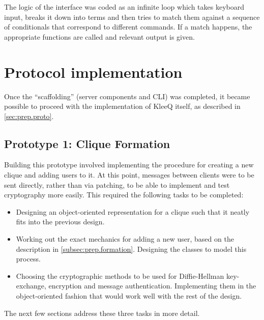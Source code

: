 \documentclass[a4paper, 12pt]{report}
\begin{document}
The logic of the interface was coded as an infinite loop which takes keyboard input, breaks it down into terms and then tries to match them against a sequence of conditionals that correspond to different commands. If a match happens, the appropriate functions are called and relevant output is given.


\section{Protocol implementation}
\label{sec:impl.proto}
Once the ``scaffolding'' (server components and CLI) was completed, it became possible to proceed with the implementation of KleeQ itself, as described in \cref{sec:prep.proto}.


\subsection{Prototype 1: Clique Formation}
\label{subsec:impl.proto.formation}
Building this prototype involved implementing the procedure for creating a new clique and adding users to it. At this point, messages between clients were to be sent directly, rather than via patching, to be able to implement and test cryptography more easily. This required the following tasks to be completed:

\begin{itemize}
    \item Designing an object-oriented representation for a clique such that it neatly fits into the previous design.
    \item Working out the exact mechanics for adding a new user, based on the description in \cref{subsec:prep.formation}. Designing the classes to model this process.
    \item Choosing the cryptographic methods to be used for Diffie-Hellman key-exchange, encryption and message authentication. Implementing them in the object-oriented fashion that would work well with the rest of the design.
\end{itemize}

The next few sections address these three tasks in more detail.
\end{document}
